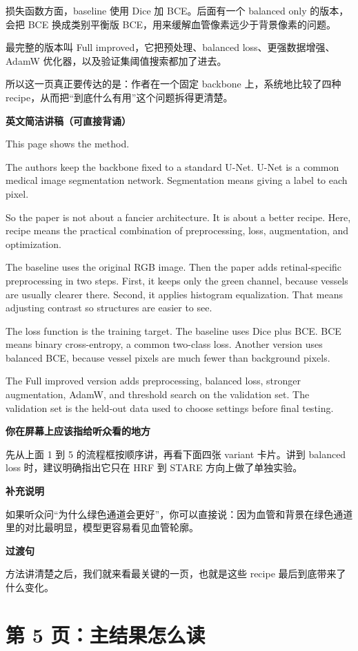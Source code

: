 \documentclass[12pt,a4paper]{ctexart}
\newcommand{\EnglishScriptHeading}{\textbf{\color{AccentGreen}英文简洁讲稿（可直接背诵）}}
\begin{document}
损失函数方面，baseline 使用 Dice 加 BCE。后面有一个 balanced only 的版本，会把 BCE 换成类别平衡版 BCE，用来缓解血管像素远少于背景像素的问题。

最完整的版本叫 Full improved，它把预处理、balanced loss、更强数据增强、AdamW 优化器，以及验证集阈值搜索都加了进去。

所以这一页真正要传达的是：作者在一个固定 backbone 上，系统地比较了四种 recipe，从而把“到底什么有用”这个问题拆得更清楚。

\EnglishScriptHeading

This page shows the method.

The authors keep the backbone fixed to a standard U-Net. U-Net is a common medical image segmentation network. Segmentation means giving a label to each pixel.

So the paper is not about a fancier architecture. It is about a better recipe. Here, recipe means the practical combination of preprocessing, loss, augmentation, and optimization.

The baseline uses the original RGB image. Then the paper adds retinal-specific preprocessing in two steps. First, it keeps only the green channel, because vessels are usually clearer there. Second, it applies histogram equalization. That means adjusting contrast so structures are easier to see.

The loss function is the training target. The baseline uses Dice plus BCE. BCE means binary cross-entropy, a common two-class loss. Another version uses balanced BCE, because vessel pixels are much fewer than background pixels.

The Full improved version adds preprocessing, balanced loss, stronger augmentation, AdamW, and threshold search on the validation set. The validation set is the held-out data used to choose settings before final testing.

\textbf{你在屏幕上应该指给听众看的地方}

先从上面 1 到 5 的流程框按顺序讲，再看下面四张 variant 卡片。讲到 balanced loss 时，建议明确指出它只在 HRF 到 STARE 方向上做了单独实验。

\textbf{补充说明}

如果听众问“为什么绿色通道会更好”，你可以直接说：因为血管和背景在绿色通道里的对比最明显，模型更容易看见血管轮廓。

\textbf{过渡句}

方法讲清楚之后，我们就来看最关键的一页，也就是这些 recipe 最后到底带来了什么变化。

\section*{第 5 页：主结果怎么读}
\end{document}
